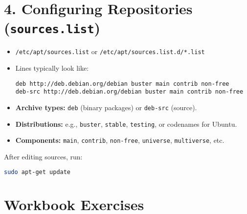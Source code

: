 \documentclass[a4paper]{report}
\begin{document}
\section*{4. Configuring Repositories (\texttt{sources.list})}

\begin{itemize}
    \item \texttt{/etc/apt/sources.list} or \texttt{/etc/apt/sources.list.d/*.list}
    \item Lines typically look like:
    \begin{lstlisting}
deb http://deb.debian.org/debian buster main contrib non-free
deb-src http://deb.debian.org/debian buster main contrib non-free
    \end{lstlisting}
    \item \textbf{Archive types:} \texttt{deb} (binary packages) or \texttt{deb-src} (source).
    \item \textbf{Distributions:} e.g., \texttt{buster}, \texttt{stable}, \texttt{testing}, or codenames for Ubuntu.
    \item \textbf{Components:} \texttt{main}, \texttt{contrib}, \texttt{non-free}, \texttt{universe}, \texttt{multiverse}, etc.
\end{itemize}

After editing sources, run:
\begin{lstlisting}[language=bash]
sudo apt-get update
\end{lstlisting}

\section*{Workbook Exercises}
\end{document}
